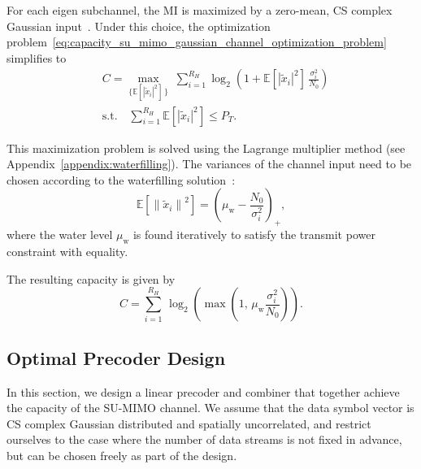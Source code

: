 For each eigen subchannel, the \acf{MI} is maximized by a zero-mean, \ac{CS} complex Gaussian input~\cite{telatar_1999}. Under this choice, the optimization problem~\eqref{eq:capacity_su_mimo_gaussian_channel_optimization_problem} simplifies to
\begin{equation}
\label{eq:capacity_su_mimo_gaussian_channel_optimization_problem_simplified}
\begin{aligned}
    & C = \max_{\{\mathbb{E}\left[|\tilde{x}_i|^2\right] \, \}} \; \sum_{i=1}^{R_H} \log_2\!\left(1 + \mathbb{E}\left[|\tilde{x}_i|^2\right] \, \frac{\sigma^2_i}{N_0} \right) \\
    & \text{s.t.} \quad \sum_{i=1}^{R_H} \mathbb{E}\left[|\tilde{x}_i|^2\right] \leq P_T.
\end{aligned}
\end{equation}

This maximization problem is solved using the Lagrange multiplier method (see Appendix~\ref{appendix:waterfilling}).
The variances of the channel input need to be chosen according to the waterfilling solution~\cite{gallager_1968}:
\begin{equation}
    \mathbb{E}\left[\left\|\tilde{x}_i\right\|^2\right] = \left(\mu_{\text{w}} - \frac{N_0}{\sigma^2_i}\right)_{+},
\end{equation}
where the water level $\mu_{\text{w}}$ is found iteratively to satisfy the transmit power constraint with equality.

The resulting capacity is given by
\begin{equation}
\label{eq:capacity_su_mimo_gaussian_channel}
    C = \sum_{i=1}^{R_H} \, \log_2\!\left( \max(1, \, \mu_{\text{w}} \frac{\sigma^2_i}{N_0}) \right).
\end{equation}

\subsection{Optimal Precoder Design}
\label{subsection:optimal_precoder_design}

In this section, we design a linear precoder and combiner that together achieve the capacity of the \ac{SU}-\ac{MIMO} channel.
We assume that the data symbol vector is \ac{CS} complex Gaussian distributed and spatially uncorrelated, and restrict ourselves to the case where the number of data streams is not fixed in advance, but can be chosen freely as part of the design.

